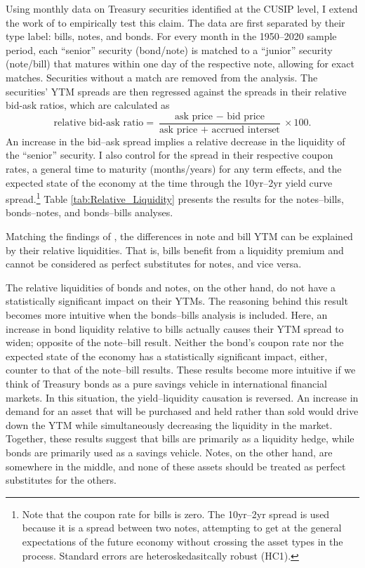\documentclass[11pt,a4paper,margin=1.5in]{article}
\begin{document}
Using monthly data on Treasury securities identified at the CUSIP level, I extend the work of \citet{Amihud-Mendelson:1991} to empirically test this claim.
The data are first separated by their type label: bills, notes, and bonds.
For every month in the 1950--2020 sample period, each ``senior'' security (bond/note) is matched to a ``junior'' security (note/bill) that matures within one day of the respective note, allowing for exact matches.
Securities without a match are removed from the analysis.
The securities' YTM spreads are then regressed against the spreads in their relative bid-ask ratios, which are calculated as 
$$ \text{relative bid-ask ratio} = \frac{\text{ask price }-\text{ bid price}}{\text{ask price }+\text{ accrued interset}}\times 100.$$
An increase in the bid--ask spread implies a relative decrease in the liquidity of the ``senior'' security.
I also control for the spread in their respective coupon rates, a general time to maturity (months/years) for any term effects, and the expected state of the economy at the time through the 10yr--2yr yield curve spread.\footnote{
	Note that the coupon rate for bills is zero.
	The 10yr--2yr spread is used because it is a spread between two notes, attempting to get at the general expectations of the future economy without crossing the asset types in the process. 
	Standard errors are heteroskedasitcally robust (HC1).
}
Table \ref{tab:Relative_Liquidity} presents the results for the notes--bills, bonds--notes, and bonds--bills analyses.

Matching the findings of \citet{Amihud-Mendelson:1991}, the differences in note and bill YTM can be explained by their relative liquidities.
That is, bills benefit from a liquidity premium and cannot be considered as perfect substitutes for notes, and vice versa.

The relative liquidities of bonds and notes, on the other hand, do not have a statistically significant impact on their YTMs.
The reasoning behind this result becomes more intuitive when the bonds--bills analysis is included.
Here, an increase in bond liquidity relative to bills actually causes their YTM spread to widen; opposite of the note--bill result.
Neither the bond's coupon rate nor the expected state of the economy has a statistically significant impact, either, counter to that of the note--bill results.
These results become more intuitive if we think of Treasury bonds as a pure savings vehicle in international financial markets.
In this situation, the yield--liquidity causation is reversed.
An increase in demand for an asset that will be purchased and held rather than sold would drive down the YTM while simultaneously decreasing the liquidity in the market.
Together, these results suggest that bills are primarily as a liquidity hedge, while bonds are primarily used as a savings vehicle.
Notes, on the other hand, are somewhere in the middle, and none of these assets should be treated as perfect substitutes for the others.
\end{document}
